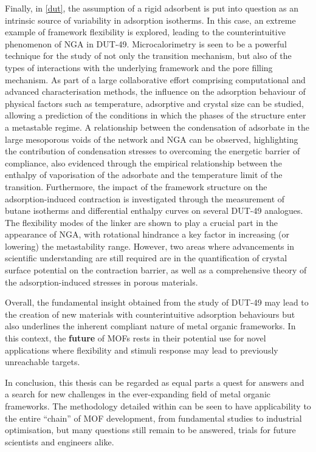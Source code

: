 Finally, in \autoref{dut}, the assumption of a rigid adsorbent 
is put into question as an intrinsic source of variability in adsorption
isotherms. In this case, an extreme example of framework flexibility
is explored, leading to the counterintuitive phenomenon of \gls{NGA}
in DUT-49.
Microcalorimetry is seen to be a powerful technique for the study
of not only the transition mechanism, but also of the types of
interactions with the underlying framework and the pore filling
mechanism. As part of a large collaborative effort comprising
computational and advanced characterisation methods, the
influence on the adsorption behaviour of physical factors such
as temperature, adsorptive and crystal size can be studied, allowing
a prediction of the conditions in which the phases of the structure
enter a metastable regime. A relationship between the condensation 
of adsorbate in the large mesoporous voids of the network and \gls{NGA}
can be observed, highlighting the contribution of condensation 
stresses to overcoming the energetic barrier of compliance, also 
evidenced through the empirical relationship between the enthalpy
of vaporisation of the adsorbate and the temperature limit 
of the transition. Furthermore, the impact of the framework
structure on the adsorption-induced contraction is investigated
through the measurement of butane isotherms and differential enthalpy
curves on several DUT-49 analogues. The flexibility modes of the 
linker are shown to play a crucial part in the appearance of 
\gls{NGA}, with rotational hindrance a key factor in increasing
(or lowering) the metastability range. However, two areas where 
advancements in scientific understanding are still required are 
in the quantification of crystal surface potential on the contraction
barrier, as well as a comprehensive theory of the adsorption-induced
stresses in porous materials.

Overall, the fundamental insight obtained from the study of 
DUT-49 may lead to the creation of new materials with counterintuitive
adsorption behaviours but also underlines the inherent compliant
nature of metal organic frameworks. In this context, the 
\textbf{future} of \glspl{MOF} rests in their potential use for
novel applications where flexibility and stimuli response may
lead to previously unreachable targets.

In conclusion, this thesis can be regarded as equal parts a quest for
answers and a search for new challenges in the ever-expanding 
field of metal organic frameworks. The methodology detailed within
can be seen to have applicability to the entire ``chain'' of
\gls{MOF} development, from fundamental studies to industrial optimisation,
but many questions still remain to be answered, trials for future
scientists and engineers alike.

\pagebreak
\let\oldaddcontentsline\addcontentsline%
\renewcommand{\addcontentsline}[3]{}%


\let\addcontentsline\oldaddcontentsline%